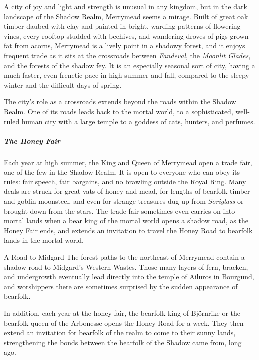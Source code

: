 \documentclass[10pt,a4paper,twoside,bg=print,twocolumn,openany,nodeprecatedcode]{dndbook}
\begin{document}
A city of joy and light and strength is unusual in any kingdom, but in the dark landscape of the Shadow Realm, Merrymead seems a mirage. Built of great oak timber daubed with clay and painted in bright, warding patterns of flowering vines, every rooftop studded with beehives, and wandering droves of pigs grown fat from acorns, Merrymead is a lively point in a shadowy forest, and it enjoys frequent trade as it sits at the crossroads between \textit{Fandeval}, the \textit{Moonlit Glades}, and the forests of the shadow fey. It is an especially seasonal sort of city, having a much faster, even frenetic pace in high summer and fall, compared to the sleepy winter and the difficult days of spring.

The city's role as a crossroads extends beyond the roads within the Shadow Realm. One of its roads leads back to the mortal world, to a sophisticated, well-ruled human city with a large temple to a goddess of cats, hunters, and perfumes.

\subparagraph{The Honey Fair}
Each year at high summer, the King and Queen of Merrymead open a trade fair, one of the few in the Shadow Realm. It is open to everyone who can obey its rules: fair speech, fair bargains, and no brawling outside the Royal Ring. Many deals are struck for great vats of honey and mead, for lengths of bearfolk timber and goblin moonsteel, and even for strange treasures dug up from \textit{Soriglass} or brought down from the stars. The trade fair sometimes even carries on into mortal lands when a bear king of the mortal world opens a shadow road, as the Honey Fair ends, and extends an invitation to travel the Honey Road to bearfolk lands in the mortal world.

\begin{DndSidebar}[float=!b]{A Road to Midgard}
The forest paths to the northeast of Merrymead contain a shadow road to Midgard's Western Wastes. Those many layers of fern, bracken, and undergrowth eventually lead directly into the temple of Ailuros in Bourgund, and worshippers there are sometimes surprised by the sudden appearance of bearfolk.



In addition, each year at the honey fair, the bearfolk king of Björnrike or the bearfolk queen of the Arbonesse opens the Honey Road for a week. They then extend an invitation for bearfolk of the realm to come to their sunny lands, strengthening the bonds between the bearfolk of the Shadow came from, long ago.



\end{DndSidebar}
\end{document}
